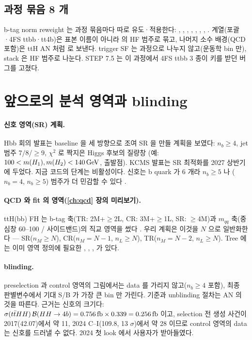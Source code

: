 \subsection{과정 묶음 8 개}
b-tag norm reweight 는 과정 묶음마다 따로 유도·적용한다: , , , , , , ,
. \ttbar{} 계열(포괄·4FS ttbb·tt4b)은 표본 이름이 아니라  의 HF 범주로 묶고, 나머지 소수 배경(QCD 포함)은
ttH AN 처럼  로 보낸다. trigger SF 는 과정으로 나누지 않고(운동학 bin 만),
stack 은 HF 범주로 나눈다. STEP 7.5 는 이 과정에서 4FS ttbb 3 종이  키를 받던 버그를 고쳤다.

\section{앞으로의 분석 영역과 blinding}\label{sec:selection-plan}

\paragraph{신호 영역(SR) 계획.}
Hbb 회의 발표는 baseline 을 세 방향으로 조여 SR 을 만들 계획을 보였다: $n_b\ge4$, jet 범주 7/8/$\ge9$, $\chi^2$ 로 짝지은 Higgs 후보의 질량창
(예: $100<m(H_1),m(H_2)<140\,\mathrm{GeV}$, 출발점). KCMS 발표는 SR 최적화를 2027 상반기에 두었다.
지금 코드의  단계는 비활성이다. \ttHH{} 신호는 b quark 가 6 개라 $n_b\ge5$ 나 ($n_b=4$, $n_b\ge5$) 범주가 더 민감할 수 있다
.

\paragraph{QCD 와 fit 의 영역(\ref{ch:qcd} 장의 미리보기).}
ttH(bb) FH 는 b-tag 축(TR: 2M+$\ge$2L, CR: 3M+$\ge$1L, SR: $\ge$4M)과 $m_{qq}$ 축(중심창 60–100\GeV{} / 사이드밴드)의 직교 영역을 썼다
. 우리 계획은 이것을 $N$ 으로 일반화한다 — SR($n_M\ge N$), CR($n_M=N-1$, $n_L\ge N$), TR($n_M=N-2$,
$n_L\ge N$)\tagplan{}. Tree 에는 이미 영역 정의에 필요한 , , , 
가 있다\tagimpl{}.

\paragraph{blinding.}
preselection 과 control 영역의 그림에서는 data 를 가리지 않고($n_b\ge4$ 포함), 최종 판별변수에서 기대 S/B 가 가장 큰 bin 만 가린다. 기준과
unblinding 절차는 AN 의 것을 따른다. 근거는 신호의 크기다: $\sigma(t\bar{t}HH)\,\mathcal{B}(HH\to4b)=0.756\,\mathrm{fb}\times0.339=0.256\,\mathrm{fb}$
이고, selection 전 생성 사건이 2017(42.07\fbinv)에서 약 11, 2024 C–I(109.8\fbinv, 13\TeV{} $\sigma$)에서 약 28 이므로 control 영역의 data 는 신호를
드러낼 수 없다. 2024 첫 look 에서 사용자가 받아들였다.

